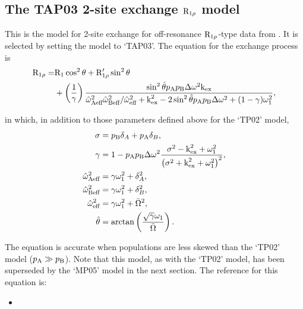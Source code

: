 
\subsection{The TAP03 2-site exchange $\mathrm{R}_{1\rho}$ model}
\label{sect: dispersion: TAP03 model}

This is the model for 2-site exchange for off-resonance $\mathrm{R}_{1\rho}$-type data from \citet{Trott03}.
It is selected by setting the model to `TAP03'.
The equation for the exchange process is
\begin{align}
    \mathrm{R}_{1\rho} = & \mathrm{R}_1\cos^2\theta + \mathrm{R}_{1\rho}'\sin^2\theta \nonumber \\
               & + \left( \frac{1}{\gamma} \right) 
                        \frac{\sin^2\hat\theta p_\textrm{A}p_\textrm{B}\Delta\omega^2\textrm{k}_\textrm{ex}}{\hat\omega_\textrm{Aeff}^2\hat\omega_\textrm{Beff}^2/\hat\omega_\textrm{eff}^2 + \textrm{k}_\textrm{ex}^2 - 2\sin^2\hat\theta p_\textrm{A}p_\textrm{B}\Delta\omega^2 + (1 - \gamma)\omega_1^2},
\end{align}

in which, in addition to those parameters defined above for the `TP02' model,
\begin{subequations}
\begin{align}
    \sigma &= p_\textrm{B}\delta_A + p_\textrm{A}\delta_B, \\
    \gamma &= 1 - p_\textrm{A}p_\textrm{B}\Delta\omega^2 \frac{\sigma^2 - \textrm{k}_\textrm{ex}^2 + \omega_1^2}{\left( \sigma^2 + \textrm{k}_\textrm{ex}^2 + \omega_1^2 \right)^2}, \\
    \hat\omega_\textrm{Aeff}^2 &= \gamma\omega_1^2 + \delta_A^2, \\
    \hat\omega_\textrm{Beff}^2 &= \gamma\omega_1^2 + \delta_B^2, \\
    \hat\omega_\textrm{eff}^2 &= \gamma\omega_1^2 + \bar\Omega^2, \\
    \hat\theta &= \arctan \left( \frac{\sqrt{\gamma}\omega_1}{\bar\Omega} \right).
\end{align}
\end{subequations}

The equation is accurate when populations are less skewed than the `TP02' model ($p_\textrm{A} \gg p_\textrm{B}$).
Note that this model, as with the `TP02' model, has been superseded by the `MP05' model in the next section.
The reference for this equation is:
\begin{itemize}
\item {}
\end{itemize}



